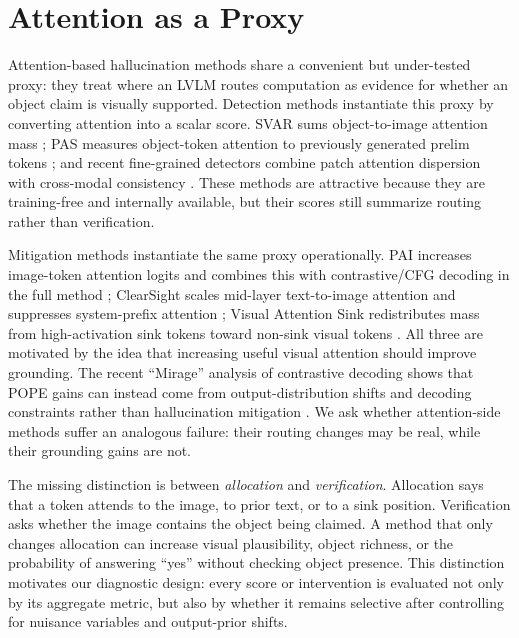 \section{Attention as a Proxy}
\label{sec:proxy}

Attention-based hallucination methods share a convenient but under-tested proxy: they treat where an LVLM routes computation as evidence for whether an object claim is visually supported. Detection methods instantiate this proxy by converting attention into a scalar score. SVAR sums object-to-image attention mass \cite{jiang2024devils}; PAS measures object-token attention to previously generated prelim tokens \cite{hoangxuan2026pas}; and recent fine-grained detectors combine patch attention dispersion with cross-modal consistency \cite{beyond2026global}. These methods are attractive because they are training-free and internally available, but their scores still summarize routing rather than verification.

Mitigation methods instantiate the same proxy operationally. PAI increases image-token attention logits and combines this with contrastive/CFG decoding in the full method \cite{liu2024pai}; ClearSight scales mid-layer text-to-image attention and suppresses system-prefix attention \cite{yin2025clearsight}; Visual Attention Sink redistributes mass from high-activation sink tokens toward non-sink visual tokens \cite{kang2025visualsink}. All three are motivated by the idea that increasing useful visual attention should improve grounding. The recent ``Mirage'' analysis of contrastive decoding shows that POPE gains can instead come from output-distribution shifts and decoding constraints rather than hallucination mitigation \cite{yin2025mirage}. We ask whether attention-side methods suffer an analogous failure: their routing changes may be real, while their grounding gains are not.




The missing distinction is between \emph{allocation} and \emph{verification}. Allocation says that a token attends to the image, to prior text, or to a sink position. Verification asks whether the image contains the object being claimed. A method that only changes allocation can increase visual plausibility, object richness, or the probability of answering ``yes'' without checking object presence. This distinction motivates our diagnostic design: every score or intervention is evaluated not only by its aggregate metric, but also by whether it remains selective after controlling for nuisance variables and output-prior shifts.

